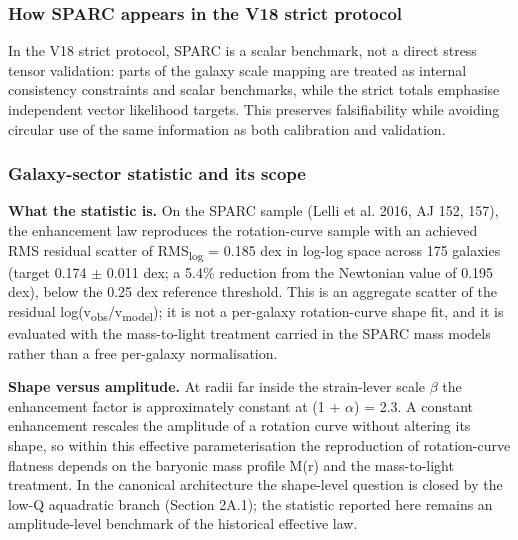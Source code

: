 \documentclass[11pt,a4paper]{article}
\begin{document}
\begin{mdframed}[linecolor=accent,linewidth=0.5pt,backgroundcolor=callout-bg,leftline=true,rightline=true,topline=true,bottomline=true,innerleftmargin=8pt,innerrightmargin=8pt,innertopmargin=6pt,innerbottommargin=6pt]
\subsubsection{How SPARC appears in the V18 strict protocol}
In the V18 strict protocol, SPARC is a scalar benchmark, not a direct stress tensor validation: parts of the galaxy scale mapping are treated as internal consistency constraints and scalar benchmarks, while the strict totals emphasise independent vector likelihood targets. This preserves falsifiability while avoiding circular use of the same information as both calibration and validation.

\subsubsection{Galaxy-sector statistic and its scope}
\begin{mdframed}[linecolor=accent,linewidth=0.5pt,backgroundcolor=callout-bg,leftline=true,rightline=true,topline=true,bottomline=true,innerleftmargin=8pt,innerrightmargin=8pt,innertopmargin=6pt,innerbottommargin=6pt]
\textbf{What the statistic is.} On the SPARC sample (Lelli et al. 2016, AJ 152, 157), the enhancement law reproduces the rotation-curve sample with an achieved RMS residual scatter of RMS\textsubscript{log} = 0.185 dex in log-log space across 175 galaxies (target 0.174 $\pm$ 0.011 dex; a 5.4\% reduction from the Newtonian value of 0.195 dex), below the 0.25 dex reference threshold. This is an aggregate scatter of the residual log(v\textsubscript{obs}/v\textsubscript{model}); it is not a per-galaxy rotation-curve shape fit, and it is evaluated with the mass-to-light treatment carried in the SPARC mass models rather than a free per-galaxy normalisation.

\textbf{Shape versus amplitude.} At radii far inside the strain-lever scale $\beta$ the enhancement factor is approximately constant at (1 + $\alpha$) = 2.3. A constant enhancement rescales the amplitude of a rotation curve without altering its shape, so within this effective parameterisation the reproduction of rotation-curve flatness depends on the baryonic mass profile M(r) and the mass-to-light treatment. In the canonical architecture the shape-level question is closed by the low-Q aquadratic branch (Section 2A.1); the statistic reported here remains an amplitude-level benchmark of the historical effective law.


\end{mdframed}
\end{mdframed}
\end{document}
